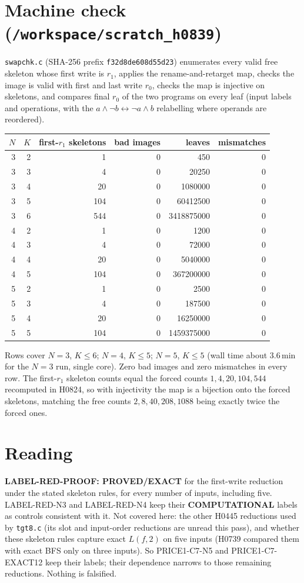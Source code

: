 \documentclass[11pt]{article}
\begin{document}
\section*{Machine check (\texttt{/workspace/scratch\_h0839})}
\texttt{swapchk.c} (SHA-256 prefix \texttt{f32d8de608d55d23}) enumerates every valid free skeleton whose first write is $r_1$, applies the rename-and-retarget map, checks the image is valid with first and last write $r_0$, checks the map is injective on skeletons, and compares final $r_0$ of the two programs on every leaf (input labels and operations, with the $a\wedge\neg b\leftrightarrow\neg a\wedge b$ relabelling where operands are reordered).
\begin{center}
\begin{tabular}{rrrrrr}
$N$ & $K$ & first-$r_1$ skeletons & bad images & leaves & mismatches\\ \hline
3 & 2 & 1 & 0 & 450 & 0\\
3 & 3 & 4 & 0 & 20250 & 0\\
3 & 4 & 20 & 0 & 1080000 & 0\\
3 & 5 & 104 & 0 & 60412500 & 0\\
3 & 6 & 544 & 0 & 3418875000 & 0\\
4 & 2 & 1 & 0 & 1200 & 0\\
4 & 3 & 4 & 0 & 72000 & 0\\
4 & 4 & 20 & 0 & 5040000 & 0\\
4 & 5 & 104 & 0 & 367200000 & 0\\
5 & 2 & 1 & 0 & 2500 & 0\\
5 & 3 & 4 & 0 & 187500 & 0\\
5 & 4 & 20 & 0 & 16250000 & 0\\
5 & 5 & 104 & 0 & 1459375000 & 0\\
\end{tabular}
\end{center}
Rows cover $N=3$, $K\le6$; $N=4$, $K\le5$; $N=5$, $K\le5$ (wall time about $3.6$\,min for the $N=3$ run, single core). Zero bad images and zero mismatches in every row. The first-$r_1$ skeleton counts equal the forced counts $1,4,20,104,544$ recomputed in H0824, so with injectivity the map is a bijection onto the forced skeletons, matching the free counts $2,8,40,208,1088$ being exactly twice the forced ones.

\section*{Reading}
\textbf{LABEL-RED-PROOF: PROVED/EXACT} for the first-write reduction under the stated skeleton rules, for every number of inputs, including five. LABEL-RED-N3 and LABEL-RED-N4 keep their \textbf{COMPUTATIONAL} labels as controls consistent with it. Not covered here: the other H0445 reductions used by \texttt{tgt8.c} (its slot and input-order reductions are unread this pass), and whether these skeleton rules capture exact $L(f,2)$ on five inputs (H0739 compared them with exact BFS only on three inputs). So PRICE1-C7-N5 and PRICE1-C7-EXACT12 keep their labels; their dependence narrows to those remaining reductions. Nothing is falsified.
\end{document}
